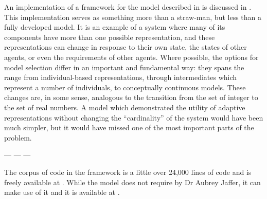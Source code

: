An implementation of a framework for the model described in \Cthree is
discussed in \Cfive.  This implementation serves as something more
than a straw-man, but less than a fully developed model.  It is an
example of a system where many of its components have more than one
possible representation, and these representations can change in
response to their own state, the states of other agents, or even the
requirements of other agents.  Where possible, the options for model
selection differ in an important and fundamental way: they spans the
range from individual-based representations, through intermediates
which represent a number of individuals, to conceptually continuous
models. These changes are, in some sense, analogous to the transition
from the set of integer to the set of real numbers.  A model which
demonstrated the utility of adaptive representations without changing
the ``cardinality'' of the system would have been much simpler, but it
would have missed one of the most important parts of the problem.

\begin{center}
--- --- ---
\end{center}

The corpus of code in the framework is a little over 24,000 lines of
\Scheme code and is freely available at \repos.  While the model does
not require  by Dr Aubrey Jaffer, it can make use of it
and it is available at
.



